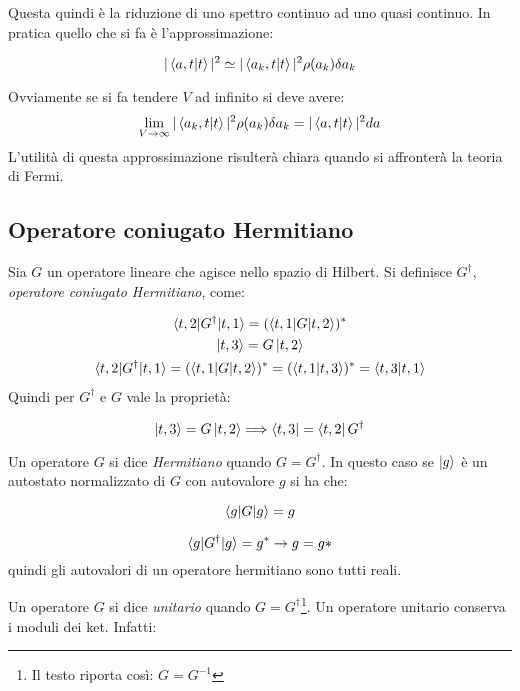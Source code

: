 Questa quindi è la riduzione di uno spettro continuo ad uno quasi continuo. In
pratica quello che si fa è l'approssimazione:

\begin{equation}
|\braket{a,t|t}|^2\simeq |\braket{a_k,t|t}|^2\rho(a_k)\delta a_k
\end{equation}

Ovviamente se si fa tendere $V$ ad infinito si deve avere:
\begin{equation}
\lim_{V\to\infty}|\braket{a_k,t|t}|^2\rho(a_k)\delta a_k = |\braket{a,t|t}|^2da
\end{equation}
L'utilità di questa approssimazione risulterà chiara quando si affronterà la teoria di Fermi.

\subsection{Operatore coniugato Hermitiano}
Sia $G$ un operatore lineare che agisce nello spazio di Hilbert. Si definisce $G^\dag$, \textit{operatore coniugato Hermitiano}, come:

\begin{gather}
\braket{t,2|G^{\dag}|t,1}=(\braket{t,1|G|t,2})^*\\
\ket{t,3}=G\ket{t,2}\\
\braket{t,2|G^{\dag}|t,1}=(\braket{t,1|G|t,2})^*=(\braket{t,1|t,3})^*=\braket{t,3|t,1}
\end{gather}
Quindi per $G^{\dag}$ e $G$ vale la proprietà:

\begin{equation}
\ket{t,3}=G\ket{t,2} \Longrightarrow \bra{t,3}=\bra{t,2}G^{\dag}
\end{equation}

Un operatore $G$ si dice \textit{Hermitiano} quando $G=G^{\dag}$. In questo caso se $\ket{g}$ è un autostato normalizzato di $G$ con autovalore $g$ si ha che:

\begin{equation}
\braket{g|G|g}=g 
\end{equation}

\begin{equation}
\braket{g|G^{\dag}|g}=g^*\rightarrow g=g*
\end{equation}
quindi gli autovalori di un operatore hermitiano sono tutti reali.

Un operatore $G$ si dice \textit{unitario} quando $G=G^{\dag}$\footnote{Il testo riporta così: $G=G^{-1}$}. Un operatore unitario conserva i moduli dei ket. Infatti:


